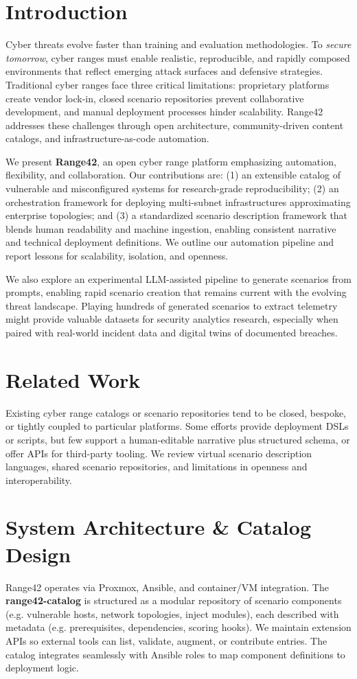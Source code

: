 \documentclass[11pt]{article}
\begin{document}
\section{Introduction}
Cyber threats evolve faster than training and evaluation methodologies. To \emph{secure tomorrow}, cyber ranges must enable realistic, reproducible, and rapidly composed environments that reflect emerging attack surfaces and defensive strategies. Traditional cyber ranges face three critical limitations: proprietary platforms create vendor lock-in, closed scenario repositories prevent collaborative development, and manual deployment processes hinder scalability. Range42 addresses these challenges through open architecture, community-driven content catalogs, and infrastructure-as-code automation.

We present \textbf{Range42}, an open cyber range platform emphasizing automation, flexibility, and collaboration. Our contributions are: (1) an extensible catalog of vulnerable and misconfigured systems for research-grade reproducibility; (2) an orchestration framework for deploying multi-subnet infrastructures approximating enterprise topologies; and (3) a standardized scenario description framework that blends human readability and machine ingestion, enabling consistent narrative and technical deployment definitions. We outline our automation pipeline and report lessons for scalability, isolation, and openness.

We also explore an experimental LLM-assisted pipeline to generate scenarios from prompts, enabling rapid scenario creation that remains current with the evolving threat landscape. Playing hundreds of generated scenarios to extract telemetry might provide valuable datasets for security analytics research, especially when paired with real-world incident data and digital twins of documented breaches.

\section{Related Work}
Existing cyber range catalogs or scenario repositories tend to be closed, bespoke, or tightly coupled to particular platforms. Some efforts provide deployment DSLs or scripts, but few support a human-editable narrative plus structured schema, or offer APIs for third-party tooling. We review virtual scenario description languages, shared scenario repositories, and limitations in openness and interoperability.

\section{System Architecture \& Catalog Design}
Range42 operates via Proxmox, Ansible, and container/VM integration.  
The \textbf{range42-catalog} is structured as a modular repository of scenario components (e.g. vulnerable hosts, network topologies, inject modules), each described with metadata (e.g. prerequisites, dependencies, scoring hooks). We maintain extension APIs so external tools can list, validate, augment, or contribute entries. The catalog integrates seamlessly with Ansible roles to map component definitions to deployment logic.
\end{document}
